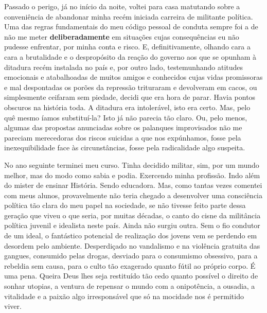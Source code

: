 Passado o perigo, já no início da noite, voltei para casa matutando sobre a conveniência de abandonar minha recém iniciada carreira de militante política.
Uma das regras fundamentais do meu código pessoal de conduta sempre foi a de não me meter \textbf{deliberadamente} em situações cujas consequências eu não pudesse enfrentar, por minha conta e risco.
E, definitivamente, olhando cara a cara a brutalidade e o despropósito da reação do governo aos que se opunham à ditadura recém instalada no país e, por outro lado, testemunhando atitudes emocionais e atabalhoadas de muitos amigos e conhecidos cujas vidas promissoras e mal despontadas os porões da repressão trituraram e devolveram em cacos, ou simplesmente ceifaram sem piedade, decidi que era hora de parar.
Havia pontos obscuros na história toda.
A ditadura era intolerável, isto era certo.
Mas, pelo quê mesmo íamos substituí-la?  Isto já não parecia tão claro.
Ou, pelo menos, algumas das propostas anunciadas sobre os palanques improvisados não me pareciam merecedoras dos riscos suicidas a que nos expúnhamos, fosse pela inexequibilidade face às circunstâncias, fosse pela radicalidade algo suspeita.


No ano seguinte terminei meu curso.
Tinha decidido militar, sim, por um mundo melhor, mas do modo como sabia e podia.
Exercendo minha profissão.
Indo além do mister de ensinar História.
Sendo educadora.
Mas, como tantas vezes comentei com meus alunos, provavelmente não teria chegado a desenvolver uma consciência política tão clara do meu papel na sociedade, se não tivesse feito parte dessa geração que viveu o que seria, por muitas décadas, o canto do cisne da militância política juvenil e idealista neste país.
 Ainda não surgiu outra.
Sem o fio condutor de um ideal, o fantástico potencial de realização dos jovens vem se perdendo em desordem pelo ambiente.
Desperdiçado no vandalismo e na violência gratuita das gangues, consumido pelas drogas, desviado para o consumismo obsessivo, para a rebeldia sem causa, para o culto tão exagerado quanto fútil ao próprio corpo.
É uma pena.
Queira Deus lhes seja restituído tão cedo quanto possível o direito de sonhar utopias, a ventura de repensar o mundo com a onipotência, a ousadia, a vitalidade e a paixão algo irresponsável que só na mocidade nos é permitido viver.

